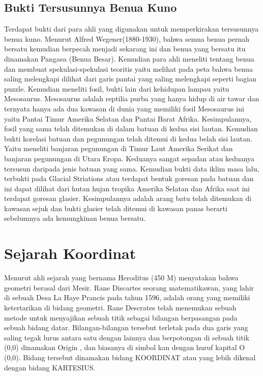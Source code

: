 \subsection{Bukti Tersusunnya Benua Kuno}
Terdapat bukti dari para ahli yang digunakan untuk memperkirakan tersusunnya benua kuno.
Menurut Alfred Wegener(1880-1930), bahwa semua benua pernah bersatu kemudian berpecah menjadi sekarang ini dan benua yang bersatu itu dinamakan Pangaea (Benua Besar)\cite{hallam1975alfred}. Kemudian para ahli meneliti tentang benua dan membuat spekulasi-spekulasi teoritis yaitu melihat pada peta bahwa benua saling melengkapi dilihat dari garis pantai yang saling melengkapi seperti bagian puzzle. Kemudian meneliti fosil, bukti lain dari kehidupan lampau yaitu Mesosaurus. Mesosaurus adalah reptilia purba yang hanya hidup di air tawar dan ternyata hanya ada dua kawasan di dunia yang memiliki fosil Mesosaurus ini yaitu Pantai Timur Amerika Selatan dan Pantai Barat Afrika. Kesimpulannya, fosil yang sama telah ditemukan di dalam batuan di kedua sisi lautan. Kemudian bukti korelasi batuan dan pegunungan telah ditemui di kedua belah sisi lautan. Yaitu meneliti banjaran pegunungan di Timur Laut Amerika Serikat dan banjaran pegunungan di Utara Eropa. Keduanya sangat sepadan atau keduanya tersusun daripada jenis batuan yang sama. Kemudian bukti data iklim masa lalu, terbukti pada Glacial Striations atau terdapat bentuk goresan pada batuan dan ini dapat dilihat dari hutan hujan tropika Amerika Selatan dan Afrika saat ini terdapat goresan glasier. Kesimpulannya adalah arang batu telah ditemukan di kawasan sejuk dan bukti glasier telah ditemui di kawasan panas berarti sebelumnya ada kemungkinan benua bersatu.

\section{Sejarah Koordinat}
Menurut ahli sejarah yang bernama Heroditus (450 M) menyatakan bahwa geometri berasal dari Mesir. Rane Discartes seorang matematikawan, yang lahir di sebuah Desa La Haye Prancis pada tahun 1596, adalah orang yang memiliki ketertarikan di bidang geometri. Rane Descrates telah menemukan sebuah metode untuk menyajikan sebuah titik sebagai bilangan berpasangan pada sebuah bidang datar. Bilangan-bilangan tersebut terletak pada dua garis yang saling tegak lurus antara satu dengan lainnya dan berpotongan di sebuah titik (0,0) dinamakan Origin , dan biasanya di simbol kan dengan huruf kapital O (0,0).
Bidang tersebut dinamakan bidang KOORDINAT atau yang lebih dikenal dengan bidang KARTESIUS.

